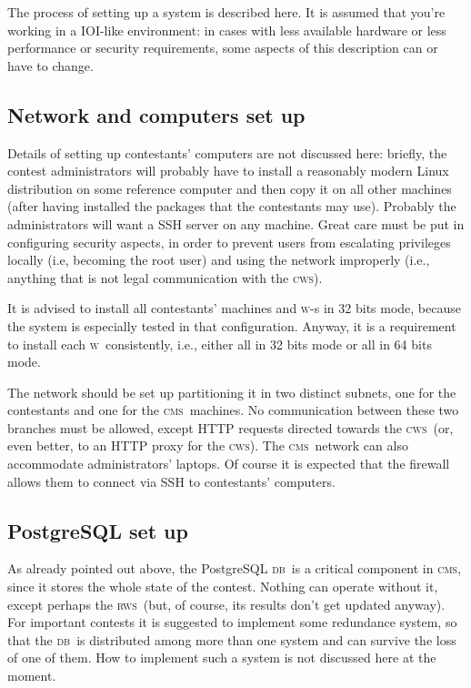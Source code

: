 \documentclass[a4paper,8pt]{amsart}
\newcommand{\CMS}{\textsc{cms}}
\newcommand{\DB}{\textsc{db}}
\newcommand{\WS}{\textsc{w}}
\newcommand{\CWS}{\textsc{cws}}
\newcommand{\RWS}{\textsc{rws}}
\begin{document}
\begin{multicols}{2}
  The process of setting up a system is described here. It is assumed
  that you're working in a IOI-like environment: in cases with less
  available hardware or less performance or security requirements,
  some aspects of this description can or have to change.

  \subsection{Network and computers set up}

  Details of setting up contestants' computers are not discussed here:
  briefly, the contest administrators will probably have to install a
  reasonably modern Linux distribution on some reference computer and
  then copy it on all other machines (after having installed the
  packages that the contestants may use). Probably the administrators
  will want a SSH server on any machine. Great care must be put in
  configuring security aspects, in order to prevent users from
  escalating privileges locally (i.e, becoming the root user) and
  using the network improperly (i.e., anything that is not legal
  communication with the \CWS).

  It is advised to install all contestants' machines and \WS-s in 32
  bits mode, because the system is especially tested in that
  configuration. Anyway, it is a requirement to install each
  \WS\ consistently, i.e., either all in 32 bits mode or all in 64
  bits mode.

  The network should be set up partitioning it in two distinct
  subnets, one for the contestants and one for the \CMS\ machines. No
  communication between these two branches must be allowed, except
  HTTP requests directed towards the \CWS\ (or, even better, to an
  HTTP proxy for the \CWS). The \CMS\ network can also accommodate
  administrators' laptops. Of course it is expected that the firewall
  allows them to connect via SSH to contestants' computers.

  \subsection{PostgreSQL set up}

  As already pointed out above, the PostgreSQL \DB\ is a critical
  component in \CMS, since it stores the whole state of the
  contest. Nothing can operate without it, except perhaps the
  \RWS\ (but, of course, its results don't get updated anyway). For
  important contests it is suggested to implement some redundance
  system, so that the \DB\ is distributed among more than one system
  and can survive the loss of one of them. How to implement such a
  system is not discussed here at the moment.


\end{multicols}
\end{document}
